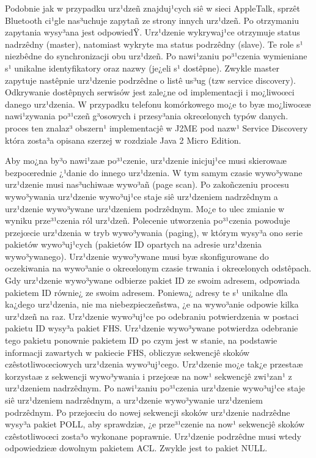  Podobnie jak w przypadku urz¹dzeñ znajduj¹cych siê w sieci
AppleTalk, sprzêt Bluetooth ci¹gle nas³uchuje zapytañ ze strony
innych urz¹dzeñ. Po otrzymaniu zapytania wysy³ana jest odpowiedŸ.
Urz¹dzenie wykrywaj¹ce otrzymuje status nadrzêdny (master),
natomiast wykryte ma status podrzêdny (slave). Te role s¹ niezbêdne
do synchronizacji obu urz¹dzeñ. Po nawi¹zaniu po³¹czenia wymieniane
s¹ unikalne identyfikatory oraz nazwy (je¿eli s¹ dostêpne). Zwykle
master zapytuje nastêpnie urz¹dzenie podrzêdne o listê us³ug (tzw
service discovery). Odkrywanie dostêpnych serwisów jest zale¿ne od
implementacji i mo¿liwoœci danego urz¹dzenia. W przypadku telefonu
komórkowego mo¿e to byæ mo¿liwoœæ nawi¹zywania po³¹czeñ g³osowych i
przesy³ania okreœlonych typów danych. proces ten znalaz³ obszern¹
implementacjê w J2ME pod nazw¹ Service Discovery która zosta³a
opisana szerzej w rozdziale Java 2 Micro Edition.
%
%

Aby mo¿na by³o nawi¹zaæ po³¹czenie, urz¹dzenie inicjuj¹ce musi
skierowaæ bezpoœrednie ¿¹danie do innego urz¹dzenia. W tym samym
czasie wywo³ywane urz¹dzenie musi nas³uchiwaæ wywo³añ (page scan).
Po zakoñczeniu procesu wywo³ywania urz¹dzenie wywo³uj¹ce staje siê
urz¹dzeniem nadrzêdnym a urz¹dzenie wywo³ywane urz¹dzeniem
podrzêdnym. Mo¿e to ulec zmianie w wyniku prze³¹czenia ról urz¹dzeñ.
Polecenie utworzenia po³¹czenia powoduje przejœcie urz¹dzenia w tryb
wywo³ywania (paging), w którym wysy³a ono serie pakietów
wywo³uj¹cych (pakietów ID opartych na adresie urz¹dzenia
wywo³ywanego). Urz¹dzenie wywo³ywane musi byæ skonfigurowane do
oczekiwania na wywo³anie o okreœlonym czasie trwania i okreœlonych
odstêpach. Gdy urz¹dzenie wywo³ywane odbierze pakiet ID ze swoim
adresem, odpowiada pakietem ID równie¿ ze swoim adresem. Poniewa¿
adresy te s¹ unikalne dla ka¿dego urz¹dzenia, nie ma
niebezpieczeñstwa, ¿e na wywo³anie odpowie kilka urz¹dzeñ na raz.
Urz¹dzenie wywo³uj¹ce po odebraniu potwierdzenia w postaci pakietu
ID wysy³a pakiet FHS. Urz¹dzenie wywo³ywane potwierdza odebranie
tego pakietu ponownie pakietem ID po czym jest w stanie, na
podstawie informacji zawartych w pakiecie FHS, obliczyæ sekwencjê
skoków czêstotliwoœciowych urz¹dzenia wywo³uj¹cego. Urz¹dzenie mo¿e
tak¿e przestaæ korzystaæ z sekwencji wywo³ywania i przejœæ na now¹
sekwencjê zwi¹zan¹ z urz¹dzeniem nadrzêdnym. Po nawi¹zaniu
po³¹czenia urz¹dzenie wywo³uj¹ce staje siê urz¹dzeniem nadrzêdnym, a
urz¹dzenie wywo³ywanie urz¹dzeniem podrzêdnym. Po przejœciu do nowej
sekwencji skoków urz¹dzenie nadrzêdne wysy³a pakiet POLL, aby
sprawdziæ, ¿e prze³¹czenie na now¹ sekwencjê skoków czêstotliwoœci
zosta³o wykonane poprawnie. Urz¹dzenie podrzêdne musi wtedy
odpowiedzieæ dowolnym pakietem ACL. Zwykle jest to pakiet NULL.

